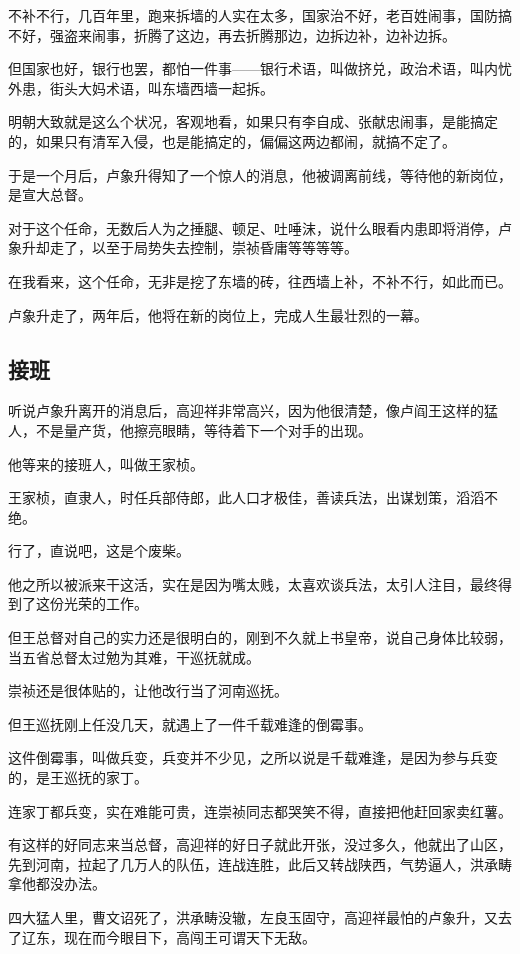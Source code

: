 \begin{multicols}{\theparacolNo}
		不补不行，几百年里，跑来拆墙的人实在太多，国家治不好，老百姓闹事，国防搞不好，强盗来闹事，折腾了这边，再去折腾那边，边拆边补，边补边拆。

		但国家也好，银行也罢，都怕一件事——银行术语，叫做挤兑，政治术语，叫内忧外患，街头大妈术语，叫东墙西墙一起拆。

		明朝大致就是这么个状况，客观地看，如果只有李自成、张献忠闹事，是能搞定的，如果只有清军入侵，也是能搞定的，偏偏这两边都闹，就搞不定了。

		于是一个月后，卢象升得知了一个惊人的消息，他被调离前线，等待他的新岗位，是宣大总督。

		对于这个任命，无数后人为之捶腿、顿足、吐唾沫，说什么眼看内患即将消停，卢象升却走了，以至于局势失去控制，崇祯昏庸等等等等。

		在我看来，这个任命，无非是挖了东墙的砖，往西墙上补，不补不行，如此而已。

		卢象升走了，两年后，他将在新的岗位上，完成人生最壮烈的一幕。

		\subsection{接班}
		听说卢象升离开的消息后，高迎祥非常高兴，因为他很清楚，像卢阎王这样的猛人，不是量产货，他擦亮眼睛，等待着下一个对手的出现。

		他等来的接班人，叫做王家桢。

		王家桢，直隶人，时任兵部侍郎，此人口才极佳，善读兵法，出谋划策，滔滔不绝。

		行了，直说吧，这是个废柴。

		他之所以被派来干这活，实在是因为嘴太贱，太喜欢谈兵法，太引人注目，最终得到了这份光荣的工作。

		但王总督对自己的实力还是很明白的，刚到不久就上书皇帝，说自己身体比较弱，当五省总督太过勉为其难，干巡抚就成。

		崇祯还是很体贴的，让他改行当了河南巡抚。

		但王巡抚刚上任没几天，就遇上了一件千载难逢的倒霉事。

		这件倒霉事，叫做兵变，兵变并不少见，之所以说是千载难逢，是因为参与兵变的，是王巡抚的家丁。

		连家丁都兵变，实在难能可贵，连崇祯同志都哭笑不得，直接把他赶回家卖红薯。

		有这样的好同志来当总督，高迎祥的好日子就此开张，没过多久，他就出了山区，先到河南，拉起了几万人的队伍，连战连胜，此后又转战陕西，气势逼人，洪承畴拿他都没办法。

		四大猛人里，曹文诏死了，洪承畴没辙，左良玉固守，高迎祥最怕的卢象升，又去了辽东，现在而今眼目下，高闯王可谓天下无敌。


\end{multicols}
